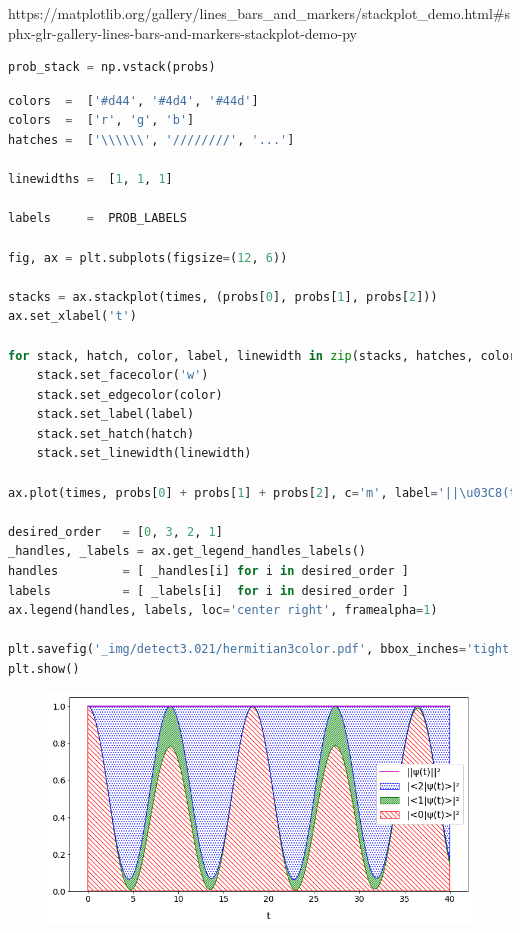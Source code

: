 https://matplotlib.org/gallery/lines\_bars\_and\_markers/stackplot\_demo.html\#sphx-glr-gallery-lines-bars-and-markers-stackplot-demo-py

\begin{lstlisting}[language=Python]
prob_stack = np.vstack(probs)
\end{lstlisting}

\begin{lstlisting}[language=Python]
colors  =  ['#d44', '#4d4', '#44d']
colors  =  ['r', 'g', 'b']
hatches =  ['\\\\\\', '////////', '...']

linewidths =  [1, 1, 1]

labels     =  PROB_LABELS

fig, ax = plt.subplots(figsize=(12, 6))

stacks = ax.stackplot(times, (probs[0], probs[1], probs[2]))
ax.set_xlabel('t')

for stack, hatch, color, label, linewidth in zip(stacks, hatches, colors, labels, linewidths):
    stack.set_facecolor('w')
    stack.set_edgecolor(color)
    stack.set_label(label)
    stack.set_hatch(hatch)
    stack.set_linewidth(linewidth)
        
ax.plot(times, probs[0] + probs[1] + probs[2], c='m', label='||\u03C8(t)||\u00B2', linewidth=1.5)

desired_order   = [0, 3, 2, 1]
_handles, _labels = ax.get_legend_handles_labels()
handles         = [ _handles[i] for i in desired_order ]
labels          = [ _labels[i]  for i in desired_order ]
ax.legend(handles, labels, loc='center right', framealpha=1)

plt.savefig('_img/detect3.021/hermitian3color.pdf', bbox_inches='tight', pad_inches=0)
plt.show()
\end{lstlisting}

\begin{figure}[h!]
\centering
\includegraphics[width=0.66\linewidth]{tex/appendix/nb/jupyter/3lev/output_20_0.png}

\end{figure}

